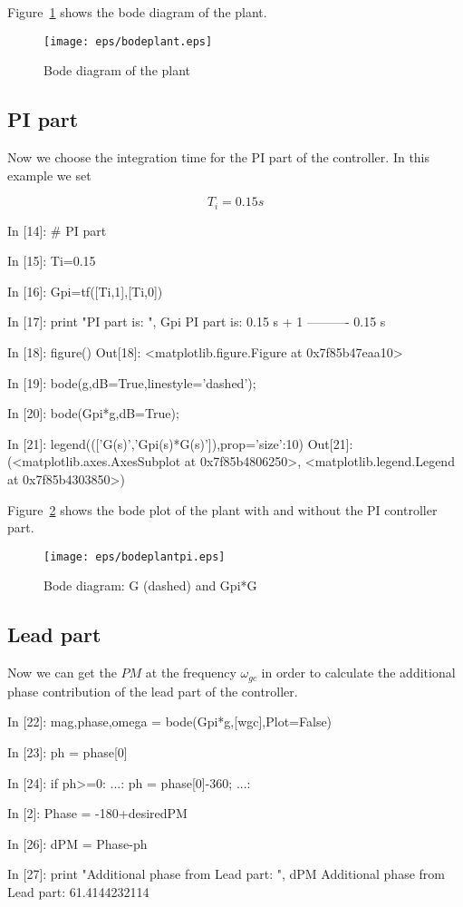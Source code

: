 Figure~\ref{F10} shows the bode diagram of the plant.

\begin{figure}[htbp]	%
\centering
\texttt{[image: eps/bodeplant.eps]}
\caption{Bode diagram of the plant}
\label{F10}
\end{figure}

\subsection{PI part}

Now we choose the integration time for the PI part of the controller. In this 
example we set

$$
T_i=0.15s
$$

\begin{code}
In [14]: # PI part

In [15]: Ti=0.15

In [16]: Gpi=tf([Ti,1],[Ti,0])

In [17]: print "PI part is: ", Gpi
PI part is:  
0.15 s + 1
----------
  0.15 s


In [18]: figure()
Out[18]: <matplotlib.figure.Figure at 0x7f85b47eaa10>

In [19]: bode(g,dB=True,linestyle='dashed');

In [20]: bode(Gpi*g,dB=True);

In [21]: legend((['G(s)','Gpi(s)*G(s)']),prop={'size':10})
Out[21]: 
(<matplotlib.axes.AxesSubplot at 0x7f85b4806250>,
 <matplotlib.legend.Legend at 0x7f85b4303850>)
\end{code}

Figure~\ref{F11} shows the bode plot of the plant with and without the PI 
controller part.

\begin{figure}[htbp]	%
\centering
\texttt{[image: eps/bodeplantpi.eps]}
\caption{Bode diagram: G (dashed) and Gpi*G}
\label{F11}
\end{figure}

\subsection{Lead part}

Now we can get the $PM$ at the frequency $\omega_{gc}$ in order to calculate 
the additional phase contribution of the lead part of the controller.

\begin{code}
In [22]: mag,phase,omega = bode(Gpi*g,[wgc],Plot=False)

In [23]: ph = phase[0]

In [24]: if ph>=0:
    ...:     ph = phase[0]-360;
    ...:     

In [2]: Phase = -180+desiredPM

In [26]: dPM = Phase-ph

In [27]: print "Additional phase from Lead part: ", dPM
Additional phase from Lead part:  61.4144232114
\end{code}

